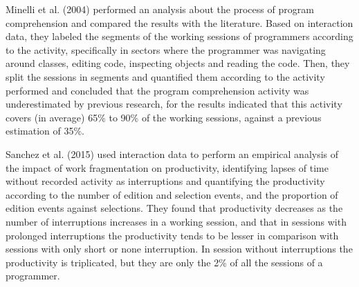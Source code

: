Minelli et al. (2004) performed an analysis about the process of program comprehension and compared the results with the literature. Based on interaction data, they labeled the segments of the working sessions of programmers according to the activity, specifically in sectors where the programmer was navigating around classes, editing code, inspecting objects and reading the code. Then, they split the sessions in segments and quantified them according to the activity performed and concluded that the program comprehension activity was underestimated by previous research, for the results indicated that this activity covers (in average) 65\% to 90\% of the working sessions, against a previous estimation of 35\%.

Sanchez et al. (2015) used interaction data to perform an empirical analysis of the impact of work fragmentation on productivity, identifying lapses of time without recorded activity as interruptions and quantifying the productivity according to the number of edition and selection events, and the proportion of edition events against selections. They found that productivity decreases as the number of interruptions increases in a working session, and that in sessions with prolonged interruptions the productivity tends to be lesser in comparison with sessions with only short or none interruption. In session without interruptions the productivity is triplicated, but they are only the 2\% of all the sessions of a programmer.
